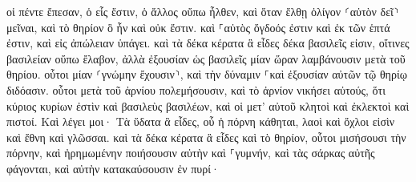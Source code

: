 \documentclass{openreader}
\begin{document}
οἱ πέντε ἔπεσαν, ὁ εἷς ἔστιν, ὁ ἄλλος οὔπω ἦλθεν, καὶ ὅταν ἔλθῃ ὀλίγον ⸂αὐτὸν δεῖ⸃ μεῖναι, 
καὶ τὸ θηρίον ὃ ἦν καὶ οὐκ ἔστιν. καὶ ⸀αὐτὸς ὄγδοός ἐστιν καὶ ἐκ τῶν ἑπτά ἐστιν, καὶ εἰς ἀπώλειαν ὑπάγει. 
καὶ τὰ δέκα κέρατα ἃ εἶδες δέκα βασιλεῖς εἰσιν, οἵτινες βασιλείαν οὔπω ἔλαβον, ἀλλὰ ἐξουσίαν ὡς βασιλεῖς μίαν ὥραν λαμβάνουσιν μετὰ τοῦ θηρίου. 
οὗτοι μίαν ⸂γνώμην ἔχουσιν⸃, καὶ τὴν δύναμιν ⸀καὶ ἐξουσίαν αὐτῶν τῷ θηρίῳ διδόασιν. 
οὗτοι μετὰ τοῦ ἀρνίου πολεμήσουσιν, καὶ τὸ ἀρνίον νικήσει αὐτούς, ὅτι κύριος κυρίων ἐστὶν καὶ βασιλεὺς βασιλέων, καὶ οἱ μετ’ αὐτοῦ κλητοὶ καὶ ἐκλεκτοὶ καὶ πιστοί. 
Καὶ λέγει μοι· Τὰ ὕδατα ἃ εἶδες, οὗ ἡ πόρνη κάθηται, λαοὶ καὶ ὄχλοι εἰσὶν καὶ ἔθνη καὶ γλῶσσαι. 
καὶ τὰ δέκα κέρατα ἃ εἶδες καὶ τὸ θηρίον, οὗτοι μισήσουσι τὴν πόρνην, καὶ ἠρημωμένην ποιήσουσιν αὐτὴν καὶ ⸀γυμνήν, καὶ τὰς σάρκας αὐτῆς φάγονται, καὶ αὐτὴν κατακαύσουσιν ἐν πυρί· 
\end{document}
